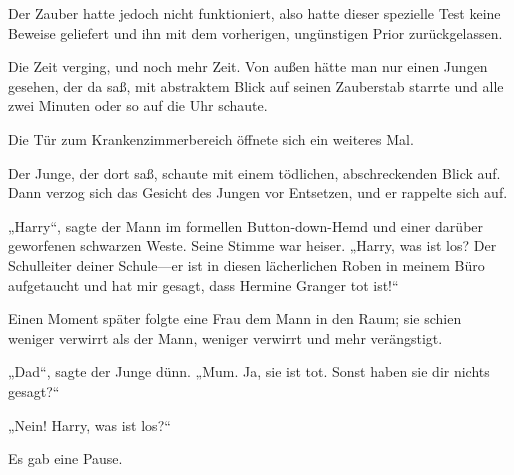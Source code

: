 Der Zauber hatte jedoch nicht funktioniert, also hatte dieser spezielle Test keine Beweise geliefert und ihn mit dem vorherigen, ungünstigen Prior zurückgelassen.

Die Zeit verging, und noch mehr Zeit.
Von außen hätte man nur einen Jungen gesehen, der da saß, mit abstraktem Blick auf seinen Zauberstab starrte und alle zwei Minuten oder so auf die Uhr schaute.

Die Tür zum Krankenzimmerbereich öffnete sich ein weiteres Mal.


Der Junge, der dort saß, schaute mit einem tödlichen, abschreckenden Blick auf. Dann verzog sich das Gesicht des Jungen vor Entsetzen, und er rappelte sich auf.

„Harry“, sagte der Mann im formellen Button-down-Hemd und einer darüber geworfenen schwarzen Weste. Seine Stimme war heiser. „Harry, was ist los? Der Schulleiter deiner Schule—er ist in diesen lächerlichen Roben in meinem Büro aufgetaucht und hat mir gesagt, dass Hermine Granger tot ist!“

Einen Moment später folgte eine Frau dem Mann in den Raum; sie schien weniger verwirrt als der Mann, weniger verwirrt und mehr verängstigt.

„Dad“, sagte der Junge dünn. „Mum. Ja, sie ist tot. Sonst haben sie dir nichts gesagt?“

„Nein! Harry, was ist los?“

Es gab eine Pause.

